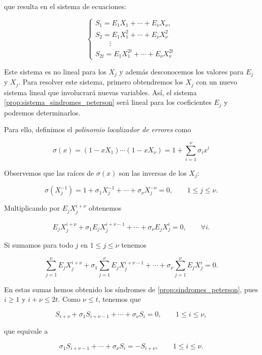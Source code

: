que resulta en el sistema de ecuaciones:

\begin{equation}
    \label{prop:sistema_sindromes_peterson}
    \left\{
    \begin{array}{c} 
        S_1 = E_1 X_1 + \cdots + E_\nu X_\nu,\\
        S_2 = E_1 X_1^2 + \cdots + E_\nu X_\nu^2\\
        \qquad \vdots \\
        S_{2t} = E_1 X_1^{2t} + \cdots + E_\nu X_\nu^{2t}
    \end{array}
    \right.
\end{equation}

Este sistema es no lineal para los $X_j$ y además desconocemos los valores para $E_j$ y $X_j$. Para resolver este sistema, primero obtendremos los $X_j$ con un nuevo sistema lineal que involucrará nuevas variables. Así, el sistema \ref{prop:sistema_sindromes_peterson} será lineal para los coeficientes $E_j$ y podremos determinarlos.

Para ello, definimos el \emph{polinomio localizador de errores} como

$$\sigma(x) = (1 - xX_1) \cdots (1 - xX_\nu) = 1 + \sum_{i=1}^\nu \sigma_i x^i$$

Observemos que las raíces de $\sigma(x)$ son las inversas de los $X_j$:

$$\sigma \left( X_j^{-1} \right) = 1 + \sigma_1 X_j^{-1} + \cdots + \sigma_\nu X_j^{-\nu} = 0, \qquad 1 \leq j \leq \nu .$$

Multiplicando por $E_j X_j^{i + \nu}$ obtenemos

$$E_j X_j^{i + \nu} + \sigma_1 E_j X_j^{i + \nu - 1} + \cdots + \sigma_\nu E_j X_j^{i} = 0, \qquad \forall i.$$

Si sumamos para todo $j$ en $1 \leq j \leq \nu$ tenemos

$$\sum_{j=1}^\nu E_j X_j^{i + \nu} + \sigma_1 \sum_{j=1}^\nu E_j X_j^{i + \nu - 1} + \cdots + \sigma_\nu \sum_{j=1}^\nu E_j X_j^{i} = 0.$$

En estas sumas hemos obtenido los síndromes de \ref{prop:sindromes_peterson}, pues $i \geq 1$ y $i + \nu \leq 2t$. Como $\nu \leq t$, tenemos que

$$S_{i + \nu} + \sigma_1 S_{i + \nu - 1} + \cdots + \sigma_\nu S_i = 0, \qquad 1 \leq i \leq \nu ,$$

que equivale a 

$$\sigma_1 S_{i + \nu - 1} + \cdots + \sigma_\nu S_i = -S_{i + \nu}, \qquad 1 \leq i \leq \nu .$$

